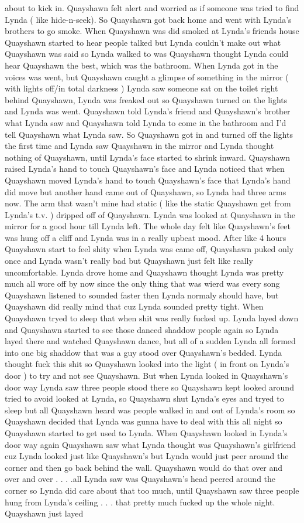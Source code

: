\documentclass[12pt]{book}
\begin{document}
about to kick in. Quayshawn felt alert and worried as if someone was tried to find Lynda ( like hide-n-seek). So Quayshawn got back home and went with Lynda's brothers to go smoke. When Quayshawn was did smoked at Lynda's friends house Quayshawn started to hear people talked but Lynda couldn't make out what Quayshawn was said so Lynda walked to was Quayshawn thought Lynda could hear Quayshawn the best, which was the bathroom. When Lynda got in the voices was went, but Quayshawn caught a glimpse of something in the mirror ( with lights off/in total darkness ) Lynda saw someone sat on the toilet right behind Quayshawn, Lynda was freaked out so Quayshawn turned on the lights and Lynda was went. Quayshawn told Lynda's friend and Quayshawn's brother what Lynda saw and Quayshawn told Lynda to come in the bathroom and I'd tell Quayshawn what Lynda saw. So Quayshawn got in and turned off the lights the first time and Lynda saw Quayshawn in the mirror and Lynda thought nothing of Quayshawn, until Lynda's face started to shrink inward. Quayshawn raised Lynda's hand to touch Quayshawn's face and Lynda noticed that when Quayshawn moved Lynda's hand to touch Quayshawn's face that Lynda's hand did move but another hand came out of Quayshawn, so Lynda had three arms now. The arm that wasn't mine had static ( like the static Quayshawn get from Lynda's t.v. ) dripped off of Quayshawn. Lynda was looked at Quayshawn in the mirror for a good hour till Lynda left. The whole day felt like Quayshawn's feet was hung off a cliff and Lynda was in a really upbeat mood. After like 4 hours Quayshawn start to feel shity when Lynda was came off, Quayshawn puked only once and Lynda wasn't really bad but Quayshawn just felt like really uncomfortable. Lynda drove home and Quayshawn thought Lynda was pretty much all wore off by now since the only thing that was wierd was every song Quayshawn listened to sounded faster then Lynda normaly should have, but Quayshawn did really mind that cuz Lynda sounded pretty tight. When Quayshawn tryed to sleep that when shit was really fucked up. Lynda layed down and Quayshawn started to see those danced shaddow people again so Lynda layed there and watched Quayshawn dance, but all of a sudden Lynda all formed into one big shaddow that was a guy stood over Quayshawn's bedded. Lynda thought fuck this shit so Quayshawn looked into the light ( in front on Lynda's door ) to try and not see Quayshawn. But when Lynda looked in Quayshawn's door way Lynda saw three people stood there so Quayshawn kept looked around tried to avoid looked at Lynda, so Quayshawn shut Lynda's eyes and tryed to sleep but all Quayshawn heard was people walked in and out of Lynda's room so Quayshawn decided that Lynda was gunna have to deal with this all night so Quayshawn started to get used to Lynda. When Quayshawn looked in Lynda's door way again Quayshawn saw what Lynda thought was Quayshawn's girlfriend cuz Lynda looked just like Quayshawn's but Lynda would just peer around the corner and then go back behind the wall. Quayshawn would do that over and over and over . . .  .all Lynda saw was Quayshawn's head peered around the corner so Lynda did care about that too much, until Quayshawn saw three people hung from Lynda's ceiling . . .  that pretty much fucked up the whole night. Quayshawn just layed 
\end{document}
